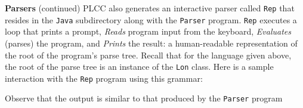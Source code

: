 \begin{minipage}[t]{\sw}
\slidenumber
\LARGE
{\bf Parsers} (continued)\exx
\Large
\emm\LightBox{\MYlonGrammarOnly}\exx
PLCC also generates an interactive parser
called \verb'Rep' that resides in the \verb'Java' subdirectory
along with the \verb'Parser' program.
\verb'Rep' executes a loop
that prints a prompt,
{\em Reads} program input from the keyboard,
{\em Evaluates} (parses) the program,
and {\em Prints} the result:
a human-readable representation
of the root of the program's parse tree.
Recall that for the language given above,
the root of the parse tree is
an instance of the \verb'Lon' class.\exx
Here is a sample interaction with the \verb'Rep' program
using this grammar:
Observe that the output is similar to that produced
by the \verb'Parser' program
\end{minipage}
\clearpage
